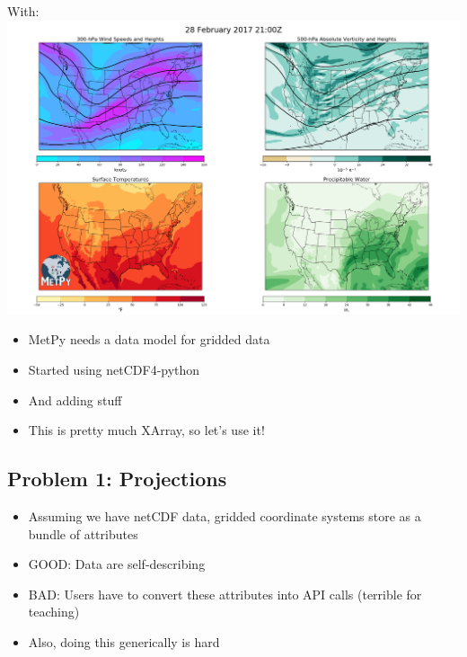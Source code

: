 \documentclass[11pt]{article}
\makeatletter
\def\maxwidth{\ifdim\Gin@nat@width>\linewidth\linewidth
    \else\Gin@nat@width\fi}
\let\Oldincludegraphics\includegraphics
\renewcommand{\includegraphics}[1]{\Oldincludegraphics[width=.8\maxwidth]{#1}}
\providecommand{\tightlist}{%
      \setlength{\itemsep}{0pt}\setlength{\parskip}{0pt}}
\makeatother
\begin{document}
    With: \includegraphics{./weather-map.png}

    \begin{itemize}
\tightlist
\item
  MetPy needs a data model for gridded data
\item
  Started using netCDF4-python
\item
  And adding stuff
\end{itemize}

    \begin{itemize}
\tightlist
\item
  This is pretty much XArray, so let's use it!
\end{itemize}

    \hypertarget{problem-1-projections}{%
\subsection{Problem 1: Projections}\label{problem-1-projections}}

\begin{itemize}
\tightlist
\item
  Assuming we have netCDF data, gridded coordinate systems store as a
  bundle of attributes
\item
  GOOD: Data are self-describing
\item
  BAD: Users have to convert these attributes into API calls (terrible
  for teaching)
\item
  Also, doing this generically is hard
\end{itemize}
\end{document}
